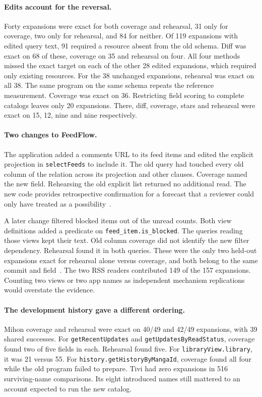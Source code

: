 \documentclass[11pt,a4paper]{article}
\newcommand{\code}[1]{\texttt{#1}}
\begin{document}
\paragraph{Edits account for the reversal.} Forty expansions were exact for both coverage and rehearsal, 31 only for coverage, two only for rehearsal, and 84 for neither. Of 119 expansions with edited query text, 91 required a resource absent from the old schema. Diff was exact on 68 of these, coverage on 35 and rehearsal on four. All four methods missed the exact target on each of the other 28 edited expansions, which required only existing resources. For the 38 unchanged expansions, rehearsal was exact on all 38. The same program on the same schema repeats the reference measurement. Coverage was exact on 36. Restricting field scoring to complete catalogs leaves only 20 expansions. There, diff, coverage, stars and rehearsal were exact on 15, 12, nine and nine respectively.

\paragraph{Two changes to FeedFlow.}
The application added a comments URL to its feed items and edited the explicit projection in \code{selectFeeds} to include it. The old query had touched every old column of the relation across its projection and other clauses. Coverage named the new field. Rehearsing the old explicit list returned no additional read. The new code provides retrospective confirmation for a forecast that a reviewer could only have treated as a possibility~\cite{feededit}.

A later change filtered blocked items out of the unread counts. Both view definitions added a predicate on \code{feed\_item.is\_blocked}. The queries reading those views kept their text. Old column coverage did not identify the new filter dependency. Rehearsal found it in both queries. These were the only two held-out expansions exact for rehearsal alone versus coverage, and both belong to the same commit and field~\cite{feedview}. The two RSS readers contributed 149 of the 157 expansions. Counting two views or two app names as independent mechanism replications would overstate the evidence.

\paragraph{The development history gave a different ordering.}
Mihon coverage and rehearsal were exact on 40/49 and 42/49 expansions, with 39 shared successes. For \code{getRecentUpdates} and \code{getUpdatesByReadStatus}, coverage found two of five fields in each. Rehearsal found five. For \code{libraryView.library}, it was 21 versus 55. For \code{history.getHistoryByMangaId}, coverage found all four while the old program failed to prepare. Tivi had zero expansions in 516 surviving-name comparisons. Its eight introduced names still mattered to an account expected to run the new catalog.
\end{document}

